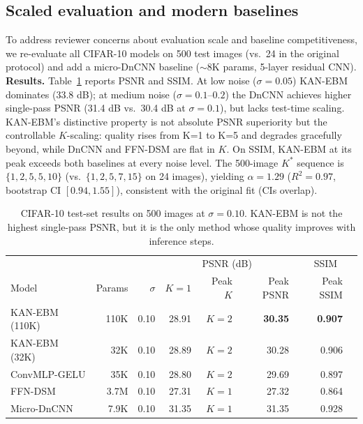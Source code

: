 \documentclass{article}
\begin{document}
\subsection{Scaled evaluation and modern baselines}
To address reviewer concerns about evaluation scale and baseline competitiveness, we re-evaluate all CIFAR-10 models on 500 test images (vs.~24 in the original protocol) and add a micro-DnCNN baseline ($\sim$8K params, 5-layer residual CNN). \textbf{Results.} Table~\ref{tab:scaled500} reports PSNR and SSIM. At low noise ($\sigma{=}0.05$) KAN-EBM dominates (33.8 dB); at medium noise ($\sigma{=}0.1$--$0.2$) the DnCNN achieves higher single-pass PSNR (31.4 dB vs.~30.4 dB at $\sigma{=}0.1$), but lacks test-time scaling. KAN-EBM's distinctive property is not absolute PSNR superiority but the controllable $K$-scaling: quality rises from K=1 to K=5 and degrades gracefully beyond, while DnCNN and FFN-DSM are flat in $K$. On SSIM, KAN-EBM at its peak exceeds both baselines at every noise level. The 500-image $K^*$ sequence is $\{1,2,5,5,10\}$ (vs.~$\{1,2,5,7,15\}$ on 24 images), yielding $\alpha{=}1.29$ ($R^2{=}0.97$, bootstrap CI $[0.94,1.55]$), consistent with the original fit (CIs overlap).

\begin{table}[h]
\centering\small
\begin{tabular}{lrr|rrr|rr}
\toprule
& & & \multicolumn{3}{c|}{PSNR (dB)} & \multicolumn{2}{c}{SSIM} \\
Model & Params & $\sigma$ & $K{=}1$ & Peak $K$ & Peak PSNR & Peak SSIM \\
\midrule
KAN-EBM (110K) & 110K & 0.10 & 28.91 & $K{=}2$ & \textbf{30.35} & \textbf{0.907} \\
KAN-EBM (32K)  & 32K  & 0.10 & 28.89 & $K{=}2$ & 30.28 & 0.906 \\
ConvMLP-GELU   & 35K  & 0.10 & 28.80 & $K{=}2$ & 29.69 & 0.897 \\
FFN-DSM        & 3.7M & 0.10 & 27.31 & $K{=}1$ & 27.32 & 0.864 \\
Micro-DnCNN    & 7.9K & 0.10 & 31.35 & $K{=}1$ & 31.35 & 0.928 \\
\bottomrule
\end{tabular}
\caption{CIFAR-10 test-set results on 500 images at $\sigma{=}0.10$. KAN-EBM is not the highest single-pass PSNR, but it is the only method whose quality improves with inference steps.}
\label{tab:scaled500}
\end{table}
\end{document}
